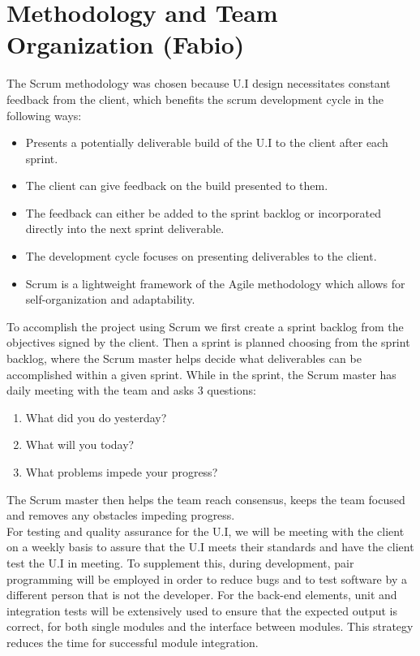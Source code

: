 \section{Methodology and Team Organization (Fabio)}
 The Scrum methodology was chosen because U.I design necessitates constant feedback from the client, which benefits the scrum development cycle in the following ways:\cite{scrumallianceWhatScrum2015}
 \begin{itemize}
 \item Presents a potentially deliverable build of the U.I to the client after each sprint.
 \item The client can give feedback on the build presented to them.
 \item The feedback can either be added to the sprint backlog or incorporated directly into the next sprint deliverable.
 \item The development cycle focuses on presenting deliverables to the client.
 \item Scrum is a lightweight framework of the Agile methodology which allows for self-organization and adaptability.
 \end{itemize}
 To accomplish the project using Scrum we first create a sprint backlog from the objectives signed by the client.\cite{scrumallianceWhatScrum2015} Then a sprint is planned choosing from the sprint backlog, where the Scrum master helps decide what deliverables can be accomplished within a given sprint.\cite{scrumallianceWhatScrum2015}\cite{eyeontechWhatScrumMaster2020} While in the sprint, the Scrum master has daily meeting with the team and asks 3 questions:\cite{eyeontechWhatScrumMaster2020}
 \begin{enumerate}
 \item What did you do yesterday?
 \item What will you today?
 \item What problems impede your progress?
 \end{enumerate}
 The Scrum master then helps the team reach consensus, keeps the team focused and removes any obstacles impeding progress.\cite{eyeontechWhatScrumMaster2020}\\
 For testing and quality assurance for the U.I, we will be meeting with the client on a weekly basis to assure that the U.I meets their standards and have the client test the U.I in meeting. To supplement this, during development, pair programming will be employed in order to reduce bugs and to test software by a different person that is not the developer. For the back-end elements, unit and integration tests will be extensively used to ensure that the expected output is correct, for both single modules and the interface between modules. This strategy reduces the time for successful module integration.\\
